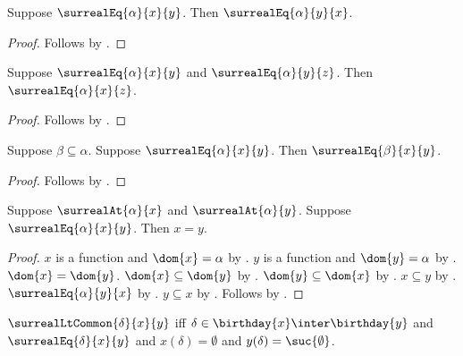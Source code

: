 \begin{proposition}\label{surreal_eq_initial_symmetric}
    Suppose $\surrealEq{\alpha}{x}{y}$.
    Then $\surrealEq{\alpha}{y}{x}$.
\end{proposition}
\begin{proof}
    Follows by .
\end{proof}

\begin{proposition}\label{surreal_eq_initial_transitive}
    Suppose $\surrealEq{\alpha}{x}{y}$ and
        $\surrealEq{\alpha}{y}{z}$.
    Then $\surrealEq{\alpha}{x}{z}$.
\end{proposition}
\begin{proof}
    Follows by .
\end{proof}

\begin{proposition}\label{surreal_eq_initial_restrict}
    Suppose $\beta\subseteq\alpha$.
    Suppose $\surrealEq{\alpha}{x}{y}$.
    Then $\surrealEq{\beta}{x}{y}$.
\end{proposition}
\begin{proof}
    Follows by .
\end{proof}

\begin{proposition}\label{surreal_eq_birthday_implies_eq}
    Suppose $\surrealAt{\alpha}{x}$ and $\surrealAt{\alpha}{y}$.
    Suppose $\surrealEq{\alpha}{x}{y}$.
    Then $x=y$.
\end{proposition}
\begin{proof}
    $x$ is a function and $\dom{x}=\alpha$
        by .
    $y$ is a function and $\dom{y}=\alpha$
        by .
    $\dom{x}=\dom{y}$.
    $\dom{x}\subseteq\dom{y}$ by .
    $\dom{y}\subseteq\dom{x}$ by .
    $x\subseteq y$ by .
    $\surrealEq{\alpha}{y}{x}$
        by .
    $y\subseteq x$ by .
    Follows by .
\end{proof}

\begin{definition}\label{surreal_lt_common}
    $\surrealLtCommon{\delta}{x}{y}$ iff
        $\delta\in\birthday{x}\inter\birthday{y}$ and
        $\surrealEq{\delta}{x}{y}$ and
        $x(\delta)=\emptyset$ and
        $y(\delta)=\suc{\emptyset}$.
\end{definition}

